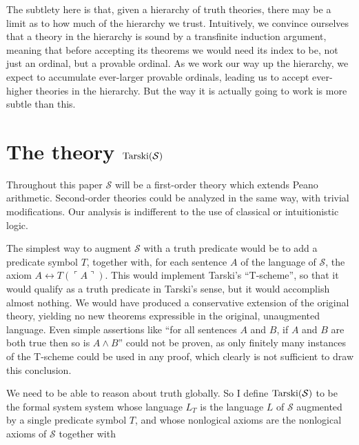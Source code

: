 \documentclass{amsart}
\begin{document}
The subtlety here is that, given a hierarchy of truth theories, there may be a limit as to how much of
the hierarchy we trust. Intuitively, we convince ourselves that a theory in the hierarchy is sound by
a transfinite induction argument, meaning that before accepting its theorems we would need its index
to be, not just an ordinal, but a provable ordinal. As we work our way up the hierarchy, we expect to
accumulate ever-larger provable ordinals, leading us to accept ever-higher theories in the hierarchy.
But the way it is actually going to work is more subtle than this.

\section{The theory ${\rm Tarski}(\mathcal{S})$}

Throughout this paper $\mathcal{S}$ will be a first-order theory which extends Peano arithmetic.
Second-order theories could be analyzed in the same way, with trivial modifications.
Our analysis is indifferent to the use of classical or intuitionistic logic.

The simplest way to augment $\mathcal{S}$ with a truth predicate would be to
add a predicate symbol $T$, together with, for each sentence $A$ of the language of $\mathcal{S}$,
the axiom $A \leftrightarrow T(\ulcorner A\urcorner)$. This would implement
Tarski's ``T-scheme'', so that it would qualify as a truth predicate in Tarski's sense, but it
would accomplish almost nothing. We would have produced a conservative extension of the
original theory, yielding no new theorems expressible in the original, unaugmented language.
Even simple assertions like ``for all sentences $A$ and $B$, if $A$ and $B$ are both true then so
is $A \wedge B$'' could not be proven, as only finitely many instances of the T-scheme could be
used in any proof, which clearly is not sufficient to draw this conclusion.

We need to be able to reason about truth globally. So I define ${\rm Tarski}(\mathcal{S})$ to be the
formal system system whose language $L_T$ is the language $L$ of $\mathcal{S}$ augmented by a
single predicate symbol $T$, and whose nonlogical axioms are the nonlogical axioms of $\mathcal{S}$
together with
\end{document}
